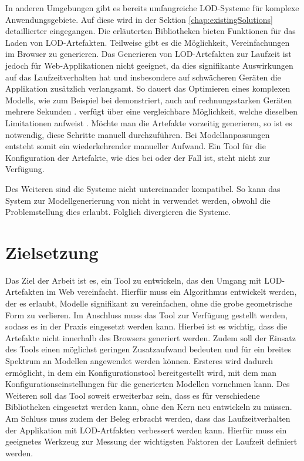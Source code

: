 In anderen Umgebungen gibt es bereits umfangreiche LOD-Systeme für komplexe Anwendungsgebiete. Auf diese wird in der Sektion \autoref{chap:existingSolutions} detaillierter eingegangen.
Die erläuterten Bibliotheken bieten Funktionen für das Laden von LOD-Artefakten. Teilweise gibt es die Möglichkeit, Vereinfachungen im Browser zu generieren. Das Generieren von LOD-Artefakten zur Laufzeit ist jedoch für Web-Applikationen nicht geeignet, da dies signifikante Auswirkungen auf das Laufzeitverhalten hat und insbesondere auf schwächeren Geräten die Applikation zusätzlich verlangsamt.
So dauert das Optimieren eines komplexen Modells, wie zum Beispiel bei  demonstriert, auch auf rechnungsstarken Geräten mehrere Sekunden \cite{babylonAutoLod}.  verfügt über eine vergleichbare Möglichkeit, welche dieselben Limitationen aufweist \cite{threeSimplifyModifier}. Möchte man die Artefakte vorzeitig generieren, so ist es notwendig, diese Schritte manuell durchzuführen. Bei Modellanpassungen entsteht somit ein wiederkehrender manueller Aufwand. Ein Tool für die Konfiguration der Artefakte, wie dies bei  oder  der Fall ist, steht nicht zur Verfügung.

Des Weiteren sind die Systeme nicht untereinander kompatibel. So kann das System zur Modellgenerierung von  nicht in  verwendet werden, obwohl die Problemstellung dies erlaubt. Folglich divergieren die Systeme.

\section{Zielsetzung}
Das Ziel der Arbeit ist es, ein Tool zu entwickeln, das den Umgang mit LOD-Artefakten im Web vereinfacht. Hierfür muss ein Algorithmus entwickelt werden, der es erlaubt, Modelle signifikant zu vereinfachen, ohne die grobe geometrische Form zu verlieren. Im Anschluss muss das Tool zur Verfügung gestellt werden, sodass es in der Praxis eingesetzt werden kann. Hierbei ist es wichtig, dass die Artefakte nicht innerhalb des Browsers generiert werden. Zudem soll der Einsatz des Tools einen möglichst geringen Zusatzaufwand bedeuten und für ein breites Spektrum an Modellen angewendet werden können. Ersteres wird dadurch ermöglicht, in dem ein Konfigurationstool bereitgestellt wird, mit dem man Konfigurationseinstellungen für die generierten Modellen vornehmen kann. Des Weiteren soll das Tool soweit erweiterbar sein, dass es für verschiedene Bibliotheken eingesetzt werden kann, ohne den Kern neu entwickeln zu müssen. Am Schluss muss zudem der Beleg erbracht werden, dass das Laufzeitverhalten der Applikation mit LOD-Artfakten verbessert werden kann. Hierfür muss ein geeignetes Werkzeug zur Messung der wichtigsten Faktoren der Laufzeit definiert werden.
